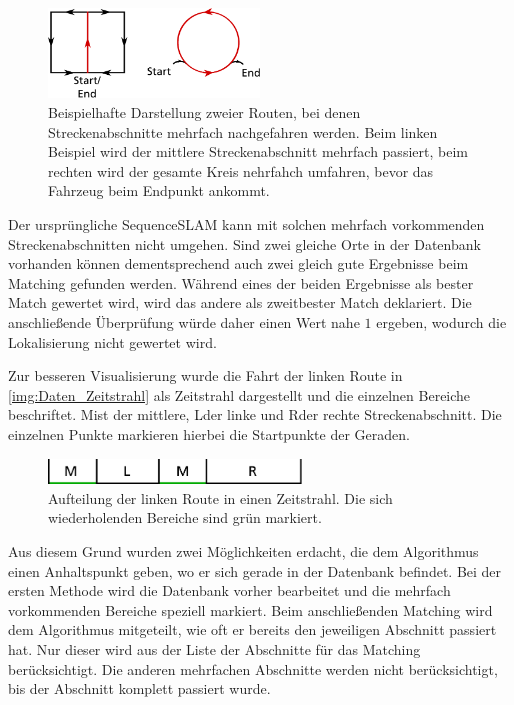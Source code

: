 \documentclass[12pt,a4paper,titlepage]{scrartcl}
\begin{document}
\begin{figure}[h.t]
	\centering
	\includegraphics[width=0.5\textwidth]{../Bilder/Loop_Closure_Beispiele.pdf}
	\caption[Beispiele für Routen mit Loop Closure]{Beispielhafte Darstellung zweier Routen, bei denen Streckenabschnitte mehrfach nachgefahren werden. Beim linken Beispiel wird der mittlere Streckenabschnitt mehrfach passiert, beim rechten wird der gesamte Kreis nehrfahch umfahren, bevor das Fahrzeug beim Endpunkt ankommt.}
	\label{img:Loop_Clos_Ex}
\end{figure}
Der ursprüngliche SequenceSLAM kann mit solchen mehrfach vorkommenden Streckenabschnitten nicht umgehen. Sind zwei gleiche Orte in der Datenbank vorhanden können dementsprechend auch zwei gleich gute Ergebnisse beim Matching gefunden werden. Während eines der beiden Ergebnisse als bester Match gewertet wird, wird das andere als zweitbester Match deklariert. Die anschließende Überprüfung würde daher einen Wert nahe $1$ ergeben, wodurch die Lokalisierung nicht gewertet wird. 

Zur besseren Visualisierung wurde die Fahrt der linken Route in \autoref{img:Daten_Zeitstrahl} als Zeitstrahl dargestellt und die einzelnen Bereiche beschriftet. \glqq M\grqq{ }ist der mittlere, \glqq L\grqq{ }der linke und \glqq R\grqq{ }der rechte Streckenabschnitt. Die einzelnen Punkte markieren hierbei die Startpunkte der Geraden.

\begin{figure}[ht]
	\centering
	\includegraphics[width=0.6\textwidth]{../Bilder/datenbank_zeitstrahl.pdf}
	\caption[Schematische Darstellung der Datenbank]{Aufteilung der linken Route in einen Zeitstrahl. Die sich wiederholenden Bereiche sind grün markiert.}
	\label{img:Daten_Zeitstrahl}
\end{figure}
Aus diesem Grund wurden zwei Möglichkeiten erdacht, die dem Algorithmus einen Anhaltspunkt geben, wo er sich gerade in der Datenbank befindet. Bei der ersten Methode wird die Datenbank vorher bearbeitet und die mehrfach vorkommenden Bereiche speziell markiert. Beim anschließenden Matching wird dem Algorithmus mitgeteilt, wie oft er bereits den jeweiligen Abschnitt passiert hat. Nur dieser wird aus der Liste der Abschnitte für das Matching berücksichtigt. Die anderen mehrfachen Abschnitte werden nicht berücksichtigt, bis der Abschnitt komplett passiert wurde.
\end{document}

